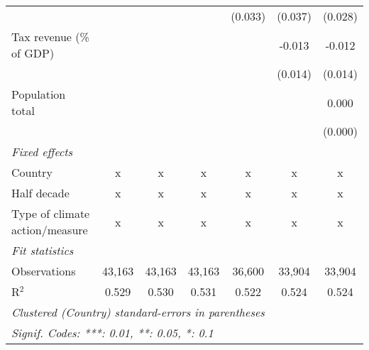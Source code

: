 \begin{tabular}{lcccccc}
                                                                 &         &         &              & (0.033)       & (0.037)       & (0.028)\\   
   Tax revenue (\% of GDP)                                       &         &         &              &               & -0.013        & -0.012\\   
                                                                 &         &         &              &               & (0.014)       & (0.014)\\   
   Population total                                              &         &         &              &               &               & 0.000\\   
                                                                 &         &         &              &               &               & (0.000)\\   
   \emph{Fixed effects}\\
   Country                                                       & x       & x       & x            & x             & x             & x\\  
   Half decade                                                   & x       & x       & x            & x             & x             & x\\  
   Type of climate action/measure                                & x       & x       & x            & x             & x             & x\\  
   \midrule \emph{Fit statistics}\\
   Observations                                                  & 43,163  & 43,163  & 43,163       & 36,600        & 33,904        & 33,904\\  
   R$^2$                                                         & 0.529   & 0.530   & 0.531        & 0.522         & 0.524         & 0.524\\  
   \midrule
   \multicolumn{7}{l}{\emph{Clustered (Country) standard-errors in parentheses}}\\
   \multicolumn{7}{l}{\emph{Signif. Codes: ***: 0.01, **: 0.05, *: 0.1}}\\
\end{tabular}
\par\endgroup


